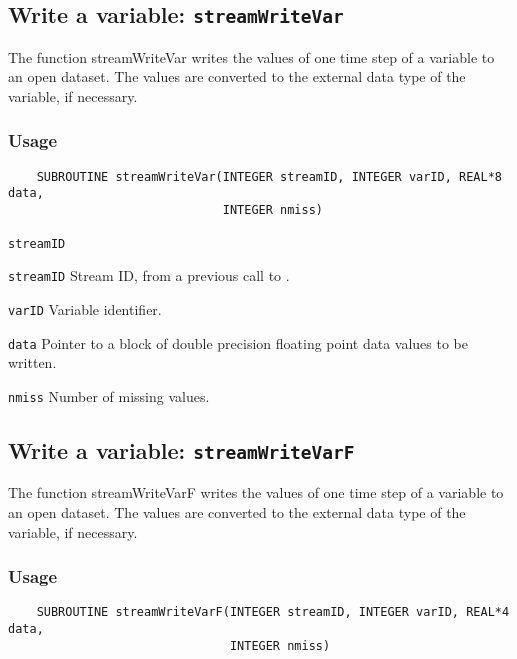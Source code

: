 

\subsection{Write a variable: \texttt{streamWriteVar}}
\label{streamWriteVar}

The function streamWriteVar writes the values of one time step of a variable to an open dataset.
The values are converted to the external data type of the variable, if necessary.
\subsubsection*{Usage}

\begin{verbatim}
    SUBROUTINE streamWriteVar(INTEGER streamID, INTEGER varID, REAL*8 data, 
                              INTEGER nmiss)
\end{verbatim}

\hspace*{4mm}\begin{minipage}[]{15cm}
\begin{deflist}{\texttt{streamID}\ }
\item[\texttt{streamID}]
Stream ID, from a previous call to {}.
\item[\texttt{varID}]
Variable identifier.
\item[\texttt{data}]
Pointer to a block of double precision floating point data values to be written.
\item[\texttt{nmiss}]
Number of missing values.

\end{deflist}
\end{minipage}


\subsection{Write a variable: \texttt{streamWriteVarF}}
\label{streamWriteVarF}

The function streamWriteVarF writes the values of one time step of a variable to an open dataset.
The values are converted to the external data type of the variable, if necessary.
\subsubsection*{Usage}

\begin{verbatim}
    SUBROUTINE streamWriteVarF(INTEGER streamID, INTEGER varID, REAL*4 data, 
                               INTEGER nmiss)
\end{verbatim}

